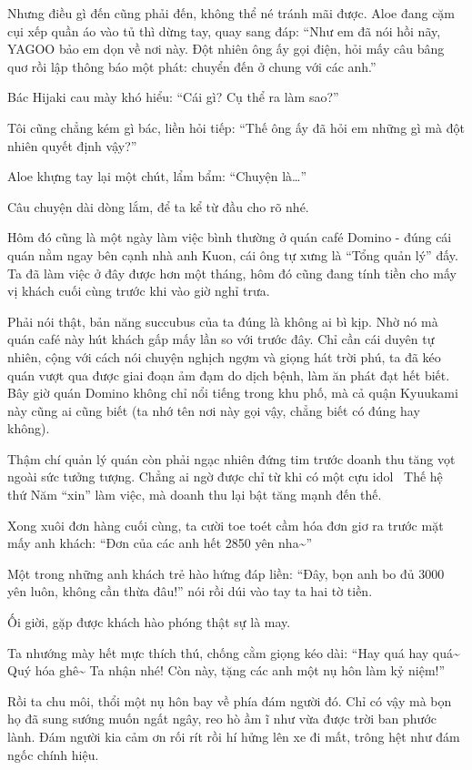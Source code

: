 \documentclass[../main.tex]{subfiles}
\begin{document}
Nhưng điều gì đến cũng phải đến, không thể né tránh mãi được. Aloe đang cặm cụi xếp quần áo vào tủ thì dừng tay, quay sang đáp: ``Như em đã nói hồi nãy, YAGOO bảo em dọn về nơi này. Đột nhiên ông ấy gọi điện, hỏi mấy câu bâng quơ rồi lập thông báo một phát: chuyển đến ở chung với các anh.''

Bác Hijaki cau mày khó hiểu: ``Cái gì? Cụ thể ra làm sao?''

Tôi cũng chẳng kém gì bác, liền hỏi tiếp: ``Thế ông ấy đã hỏi em những gì mà đột nhiên quyết định vậy?''

Aloe khựng tay lại một chút, lẩm bẩm: ``Chuyện là\dots''


Câu chuyện dài dòng lắm, để ta kể từ đầu cho rõ nhé.

Hôm đó cũng là một ngày làm việc bình thường ở quán café Domino - đúng cái quán nằm ngay bên cạnh nhà anh Kuon, cái ông tự xưng là ``Tổng quản lý'' đấy. Ta đã làm việc ở đây được hơn một tháng, hôm đó cũng đang tính tiền cho mấy vị khách cuối cùng trước khi vào giờ nghỉ trưa.

Phải nói thật, bản năng succubus của ta đúng là không ai bì kịp. Nhờ nó mà quán café này hút khách gấp mấy lần so với trước đây. Chỉ cần cái duyên tự nhiên, cộng với cách nói chuyện nghịch ngợm và giọng hát trời phú, ta đã kéo quán vượt qua được giai đoạn ảm đạm do dịch bệnh, làm ăn phát đạt hết biết. Bây giờ quán Domino không chỉ nổi tiếng trong khu phố, mà cả quận Kyuukami này cũng ai cũng biết (ta nhớ tên nơi này gọi vậy, chẳng biết có đúng hay không).

Thậm chí quản lý quán còn phải ngạc nhiên đứng tim trước doanh thu tăng vọt ngoài sức tưởng tượng. Chẳng ai ngờ được chỉ từ khi có một cựu idol \hll\ Thế hệ thứ Năm ``xin'' làm việc, mà doanh thu lại bật tăng mạnh đến thế.

Xong xuôi đơn hàng cuối cùng, ta cười toe toét cầm hóa đơn giơ ra trước mặt mấy anh khách: ``Đơn của các anh hết 2850 yên nha\~{}''

Một trong những anh khách trẻ hào hứng đáp liền: ``Đây, bọn anh bo đủ 3000 yên luôn, không cần thừa đâu!'' nói rồi dúi vào tay ta hai tờ tiền.

Ối giời, gặp được khách hào phóng thật sự là may.

Ta nhướng mày hết mực thích thú, chống cằm giọng kéo dài: ``Hay quá hay quá\~{} Quý hóa ghê\~{} Ta nhận nhé! Còn này, tặng các anh một nụ hôn làm kỷ niệm!''

Rồi ta chu môi, thổi một nụ hôn bay về phía đám người đó. Chỉ có vậy mà bọn họ đã sung sướng muốn ngất ngây, reo hò ầm ĩ như vừa được trời ban phước lành. Đám người kia cảm ơn rối rít rồi hí hửng lên xe đi mất, trông hệt như đám ngốc chính hiệu.
\end{document}
